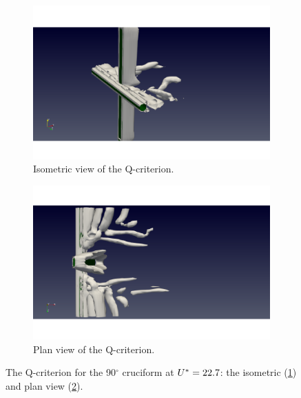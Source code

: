 \documentclass[oneside]{utmthesis}
\begin{document}
\begin{figure}
  \centering
  \begin{subfigure}[h]{0.9\textwidth}
    \includegraphics[width=\textwidth]{figs/qIso090U10}
    \caption{Isometric view of the Q-criterion.}
    \label{fig:qIso090U10}
  \end{subfigure}
  
  \begin{subfigure}[h]{0.9\textwidth}
    \includegraphics[width=\textwidth]{figs/qTop090U10}
    \caption{Plan view of the Q-criterion.}
    \label{fig:qTop090U10}
  \end{subfigure}

  \caption{The Q-criterion for the 90$^{\circ}$ cruciform at $U^{*} = 22.7$: the isometric (\ref{fig:qIso090U10}) and plan view (\ref{fig:qTop090U10}).} \label{fig:qCrit090U10}
\end{figure}
\end{document}
